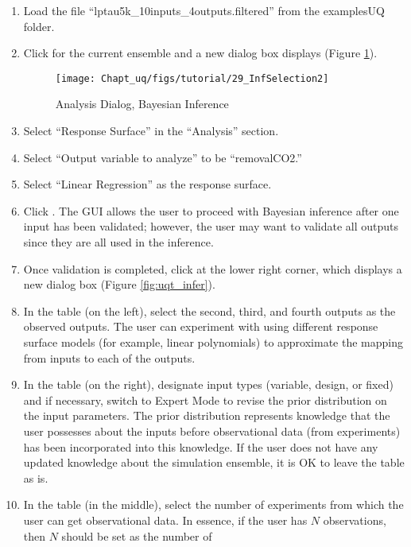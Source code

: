 \begin{enumerate}
\item{Load the file ``lptau5k\_10inputs\_4outputs.filtered'' from the examples\bs UQ folder.}
\item{Click  for the current ensemble and a new dialog box displays (Figure \ref{fig:uqt_analysis_infer}).
\begin{figure}[H]
\centering \texttt{[image: Chapt\_uq/figs/tutorial/29\_InfSelection2]}
\caption{Analysis Dialog, Bayesian Inference}
\label{fig:uqt_analysis_infer}
\end{figure}
}
\item{Select ``Response Surface'' in the ``Analysis'' section.}
\item{Select ``Output variable to analyze'' to be ``removalCO2.''}
\item{Select ``Linear Regression'' as the response surface.}
\item{Click . The GUI allows the user to proceed with Bayesian
  inference after one input has been validated; however, the user may want
  to validate all outputs since they are all used in the inference.}
\item{Once validation is completed, click  at the lower right
  corner, which displays a new dialog box (Figure \ref{fig:uqt_infer}).}
\item{In the  table (on the left), select the second, third, and fourth outputs as the observed outputs.
  The user
  can experiment with using different response surface models (for example,
  linear polynomials) to approximate the mapping from inputs to each of the
  outputs. }
\item{In the  table (on the right), 
  designate input types (variable, design, or fixed) and if necessary,
  switch to Expert Mode to revise the prior distribution on the input parameters.
  The prior distribution represents knowledge that the user possesses about
  the inputs before observational data (from experiments) has been
  incorporated into this knowledge. If the user does not have any updated
  knowledge about the simulation ensemble, it is OK to leave the table as is.}  
\item{In the  table (in the middle), select the number of
  experiments from which the user can get observational data. In essence, if the user
  has $N$ observations, then $N$ should be set as the number of
}
\end{enumerate}

